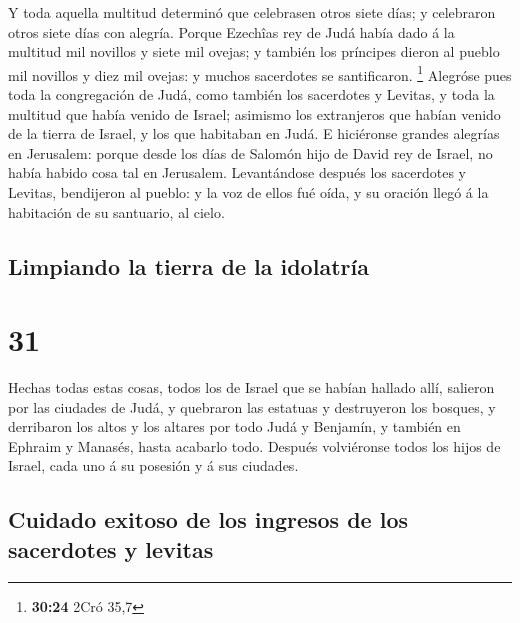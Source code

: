  Y toda aquella multitud determinó que celebrasen otros
siete días; y celebraron otros siete días con alegría. 
Porque Ezechîas rey de Judá había dado á la multitud mil novillos y
siete mil ovejas; y también los príncipes dieron al pueblo mil novillos
y diez mil ovejas: y muchos sacerdotes se santificaron. \footnote{\textbf{30:24}
  2Cró 35,7}  Alegróse pues toda la congregación de Judá,
como también los sacerdotes y Levitas, y toda la multitud que había
venido de Israel; asimismo los extranjeros que habían venido de la
tierra de Israel, y los que habitaban en Judá.  E
hiciéronse grandes alegrías en Jerusalem: porque desde los días de
Salomón hijo de David rey de Israel, no había habido cosa tal en
Jerusalem.  Levantándose después los sacerdotes y Levitas,
bendijeron al pueblo: y la voz de ellos fué oída, y su oración llegó á
la habitación de su santuario, al cielo.

\hypertarget{limpiando-la-tierra-de-la-idolatruxeda}{%
\subsection{Limpiando la tierra de la
idolatría}\label{limpiando-la-tierra-de-la-idolatruxeda}}

\hypertarget{section-30}{%
\section{31}\label{section-30}}

 Hechas todas estas cosas, todos los de Israel que se habían
hallado allí, salieron por las ciudades de Judá, y quebraron las
estatuas y destruyeron los bosques, y derribaron los altos y los altares
por todo Judá y Benjamín, y también en Ephraim y Manasés, hasta acabarlo
todo. Después volviéronse todos los hijos de Israel, cada uno á su
posesión y á sus ciudades.

\hypertarget{cuidado-exitoso-de-los-ingresos-de-los-sacerdotes-y-levitas}{%
\subsection{Cuidado exitoso de los ingresos de los sacerdotes y
levitas}\label{cuidado-exitoso-de-los-ingresos-de-los-sacerdotes-y-levitas}}

